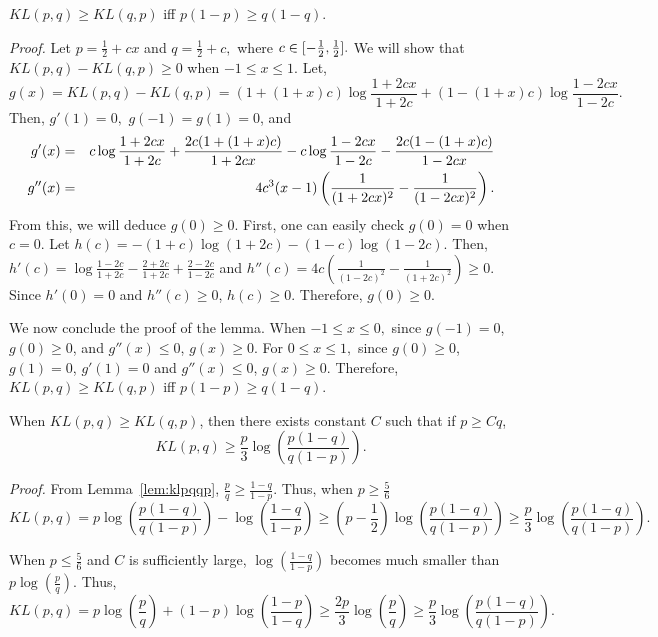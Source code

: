 \begin{lemma} $KL(p,q) \ge KL(q,p)$ iff $p(1-p) \ge
  q(1-q).$ \label{lem:klpqqp} \end{lemma}

{\it Proof.} %
Let $p = \frac{1}{2}+cx$ and $q = \frac{1}{2}+c,$ where $c\in
[-{1\over 2},\frac{1}{2}].$ We will show that $KL(p,q)-KL(q,p)
\ge 0$ when $-1\le x\le 1$. Let,
$$g(x)=KL(p,q)-KL(q,p) = (1+(1+x)c)\log\frac{1+2cx}{1+2c} + (1-(1+x)c)\log\frac{1-2cx}{1-2c}. $$
Then, $g'(1)=0,$ $g(-1)=g(1)=0$, and
\begin{eqnarray*}
g'(x) &= & c\log\frac{1+2cx}{1+2c}+\frac{2c(1+(1+x)c)}{1+2cx} -c\log\frac{1-2cx}{1-2c}-\frac{2c(1-(1+x)c)}{1-2cx} \cr
g''(x) &= & 4c^3 (x-1) \left(  \frac{1}{(1+2cx)^2} - \frac{1}{(1-2cx)^2} \right). 
\end{eqnarray*}
From this, we will deduce  $g(0)\ge 0$.  First, one can easily check $g(0)=0$ when $c=0.$ Let $h(c) =  -(1+c)\log(1+2c)
- (1-c)\log(1-2c).$ Then, $h'(c) =  \log \frac{1-2c}{1+2c}
-\frac{2+2c}{1+2c} + \frac{2-2c}{1-2c} $ and
 $h''(c) = 4c\left( \frac{1}{(1-2c)^2}-\frac{1}{(1+2c)^2} \right) \ge
 0.$ Since $h'(0) = 0$ and $h''(c) \ge 0$, $h(c) \ge 0$. Therefore,
 $g(0) \ge 0.$

We now conclude the proof of the lemma. When $-1 \le x \le 0,$ since $g(-1)=0$, $g(0)\ge 0$, and $g''(x) \le 0$,  $g(x) \ge 0.$ For $0\le x \le 1,$ since $g(0)\ge 0$, $g(1)=0$, $g'(1)=0$ and $g''(x) \le 0$, $g(x) \ge 0.$
Therefore, $KL(p,q) \ge KL(q,p)$ iff $p(1-p) \ge q(1-q).$

\begin{lemma}When $KL(p,q)\ge KL(q,p)$, then there exists constant $C$ such that if $p \ge Cq$, 
$$KL(p,q) \ge \frac{p}{3}\log\left(\frac{p(1-q)}{q(1-p)} \right) .$$\label{lem:klubnd}
\end{lemma}

{\it Proof.} From Lemma~\ref{lem:klpqqp}, $\frac{p}{q} \ge
\frac{1-q}{1-p}.$ Thus, when $p\ge \frac{5}{6}$
$$KL(p,q) = p\log\left(\frac{p(1-q)}{q(1-p)} \right) -
\log\left(\frac{1-q}{1-p} \right) \ge (p-\frac{1}{2})  \log\left(\frac{p(1-q)}{q(1-p)}
\right) \ge \frac{p}{3}\log\left(\frac{p(1-q)}{q(1-p)} \right). $$

When $p \le \frac{5}{6}$ and $C$ is sufficiently large,
$\log(\frac{1-q}{1-p})$ becomes much smaller than $
p\log\left(\frac{p}{q} \right) .$ Thus,
$$KL(p,q) = p\log\left(\frac{p}{q} \right) +(1-p)
\log\left(\frac{1-p}{1-q} \right) \ge \frac{2p}{3}\log\left(\frac{p}{q} \right)  \ge \frac{p}{3}\log\left(\frac{p(1-q)}{q(1-p)} \right). $$

